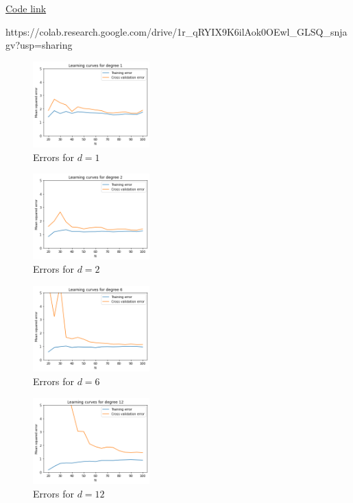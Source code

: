 \begin{problem}[14]
\end{problem}

\newpage

\begin{solution}
  \href{https://colab.research.google.com/drive/1r_qRYIX9K6ilAok0OEwl_GLSQ_snjagv?usp=sharing}{Code link}

  https://colab.research.google.com/drive/1r_qRYIX9K6ilAok0OEwl_GLSQ_snjagv?usp=sharing

  \begin{figure}[H]
    \centering
    \includegraphics[width=0.4\textwidth]{images/2b_1.png}
    \caption{Errors for $d = 1$}
    \label{fig:2b_1}
  \end{figure}

  \begin{figure}[H]
    \centering
    \includegraphics[width=0.4\textwidth]{images/2b_2.png}
    \caption{Errors for $d = 2$}
    \label{fig:2b_2}
  \end{figure}

  \begin{figure}[H]
    \centering
    \includegraphics[width=0.4\textwidth]{images/2b_3.png}
    \caption{Errors for $d = 6$}
    \label{fig:2b_3}
  \end{figure}

  \begin{figure}[H]
    \centering
    \includegraphics[width=0.4\textwidth]{images/2b_4.png}
    \caption{Errors for $d = 12$}
    \label{fig:2b_4}
  \end{figure}
\end{solution}

